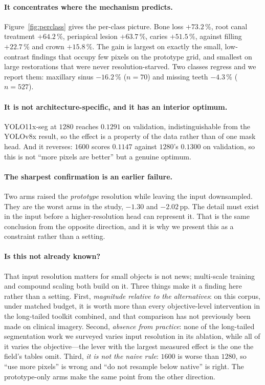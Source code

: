 \documentclass[10pt,twocolumn,letterpaper]{article}
\begin{document}
\paragraph{It concentrates where the mechanism predicts.} Figure~\ref{fig:perclass}
gives the per-class picture. Bone loss $+73.2$\,\%, root canal treatment $+64.2$\,\%, periapical lesion
$+63.7$\,\%, caries $+51.5$\,\%, against filling $+22.7$\,\% and crown
$+15.8$\,\%. The gain is largest on exactly the small, low-contrast findings that
occupy few pixels on the prototype grid, and smallest on large restorations that
were never resolution-starved. Two classes regress and we report them: maxillary
sinus $-16.2$\,\% ($n{=}70$) and missing teeth $-4.3$\,\% ($n{=}527$).

\paragraph{It is not architecture-specific, and it has an interior optimum.}
YOLO11x-seg at $1280$ reaches $0.1291$ on validation, indistinguishable from the
YOLOv8x result, so the effect is a property of the data rather than of one mask
head. And it reverses: $1600$ scores $0.1147$ against $1280$'s $0.1300$ on
validation, so this is not ``more pixels are better'' but a genuine optimum.

\paragraph{The sharpest confirmation is an earlier failure.} Two arms raised the
\emph{prototype} resolution while leaving the input downsampled. They are the
worst arms in the study, $-1.30$ and $-2.02$\,pp. The detail must exist in the
input before a higher-resolution head can represent it. That is the same
conclusion from the opposite direction, and it is why we present this as a
constraint rather than a setting.

\paragraph{Is this not already known?} That input resolution matters
for small objects is not news; multi-scale training\cite{singh2018sniper} and
compound scaling\cite{tan2020efficientdet} both build on it. Three things make it
a finding here rather than a setting. First, \emph{magnitude relative to the
alternatives}: on this corpus, under matched budget, it is worth more than every
objective-level intervention in the long-tailed toolkit combined, and that
comparison has not previously been made on clinical imagery. Second,
\emph{absence from practice}: none of the long-tailed segmentation work we
surveyed varies input resolution in its ablation, while all of it varies the
objective---the lever with the largest measured effect is the one the field's
tables omit. Third, \emph{it is not the naive rule}: $1600$ is worse than $1280$,
so ``use more pixels'' is wrong and ``do not resample below native'' is right. The
prototype-only arms make the same point from the other direction.
\end{document}
